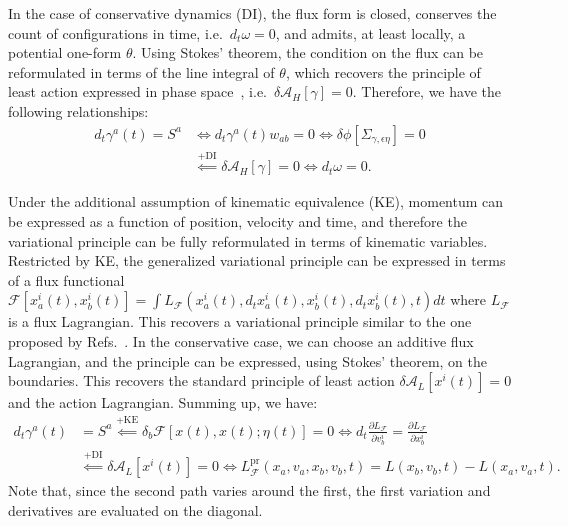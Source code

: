 \documentclass[nofootinbib,aps,pre]{revtex4-2}
\begin{document}
In the case of conservative dynamics (DI), the flux form is closed, conserves the count of configurations in time, i.e.~$d_t \omega =0$, and admits, at least locally, a potential one-form $\theta$. Using Stokes' theorem, the condition on the flux can be reformulated in terms of the line integral of $\theta$, which recovers the principle of least action expressed in phase space~\cite{geoact}, i.e.~$\delta \mathcal{A}_H[\gamma] = 0$. Therefore, we have the following relationships:
\begin{equation}
	\begin{aligned}
		d_t \gamma^a(t) = S^a &\iff d_t \gamma^a(t) w_{ab}=0 \iff \delta \phi[\Sigma_{\gamma, \epsilon \eta}]=0 \\&\stackrel{\text{+DI}}{\impliedby} \delta \mathcal{A}_H[\gamma] = 0 \iff d_t \omega =0.
	\end{aligned}
\end{equation}

Under the additional assumption of kinematic equivalence (KE), momentum can be expressed as a function of position, velocity and time, and therefore the variational principle can be fully reformulated in terms of kinematic variables. Restricted by KE, the generalized variational principle can be expressed in terms of a flux functional $\mathcal{F}[x^i_a(t), x^i_b(t)] = \int L_{\mathcal{F}}(x^i_a(t), d_t x^i_a(t), x^i_b(t), d_t x^i_b(t), t)dt$ where $L_{\mathcal{F}}$ is a flux Lagrangian. This recovers a variational principle similar to the one proposed by Refs.~\cite{galley,galleytsangstein}. In the conservative case, we can choose an additive flux Lagrangian, and the principle can be expressed, using Stokes' theorem, on the boundaries. This recovers the standard principle of least action $\delta \mathcal{A}_L[x^i(t)] = 0$ and the action Lagrangian. Summing up, we have:
\begin{equation}
	\begin{aligned}
		d_t \gamma^a(t) &= S^a \stackrel{\text{+KE}}{\impliedby} \delta_b\mathcal{F}[x(t),x(t);\eta(t)]=0 \iff d_t\frac{\partial L_{\mathcal{F}}}{\partial v_b^i}=\frac{\partial L_{\mathcal{F}}}{\partial x_b^i} \\&\stackrel{\text{+DI}}{\impliedby} \delta \mathcal{A}_L[x^i(t)] = 0 \iff L_{\mathcal{F}}^{\mathrm{pr}}(x_a,v_a,x_b,v_b,t)=L(x_b,v_b,t)-L(x_a,v_a, t).
	\end{aligned}
\end{equation}
Note that, since the second path varies around the first, the first variation and derivatives are evaluated on the diagonal.
\end{document}
